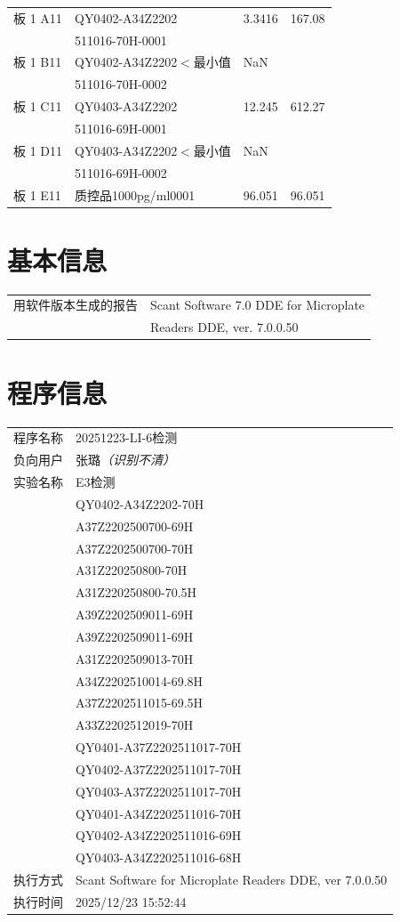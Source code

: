 \documentclass[UTF8,10pt,a4paper,fontset=fandol]{ctexart}
\begin{document}
\begin{tabular}{@{}llll@{}}
板 1 A11 & QY0402-A34Z2202 & 3.3416 & 167.08\\
          & 511016-70H-0001 & &\\
板 1 B11 & QY0402-A34Z2202\quad $<$最小值 & NaN &\\
          & 511016-70H-0002 & &\\
板 1 C11 & QY0403-A34Z2202 & 12.245 & 612.27\\
          & 511016-69H-0001 & &\\
板 1 D11 & QY0403-A34Z2202\quad $<$最小值 & NaN &\\
          & 511016-69H-0002 & &\\
板 1 E11 & 质控品1000pg/ml0001 & 96.051 & 96.051
\end{tabular}

\section*{基本信息}

\begin{tabular}{@{}ll@{}}
用软件版本生成的报告 & Scant Software 7.0 DDE for Microplate\\
& Readers DDE, ver. 7.0.0.50
\end{tabular}

\section*{程序信息}

\begin{tabular}{@{}ll@{}}
程序名称 & 20251223-LI-6检测\\
负向用户 & 张璐\textit{（识别不清）}\\
实验名称 & E3检测\\
& QY0402-A34Z2202-70H\\
& A37Z2202500700-69H\\
& A37Z2202500700-70H\\
& A31Z220250800-70H\\
& A31Z220250800-70.5H\\
& A39Z2202509011-69H\\
& A39Z2202509011-69H\\
& A31Z2202509013-70H\\
& A34Z2202510014-69.8H\\
& A37Z2202511015-69.5H\\
& A33Z2202512019-70H\\
& QY0401-A37Z2202511017-70H\\
& QY0402-A37Z2202511017-70H\\
& QY0403-A37Z2202511017-70H\\
& QY0401-A34Z2202511016-70H\\
& QY0402-A34Z2202511016-69H\\
& QY0403-A34Z2202511016-68H\\
执行方式 & Scant Software for Microplate Readers DDE, ver 7.0.0.50\\
执行时间 & 2025/12/23 15:52:44
\end{tabular}
\end{document}
